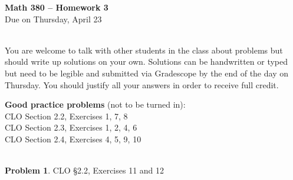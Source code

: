 \documentclass[12pt]{amsart}
\theoremstyle{definition}
\newtheorem{prob}{Problem}
\begin{document}
 \thispagestyle{empty}
\begin{center} {\large \textbf{Math 380 -- Homework  3}} \smallskip \\ 
Due on Thursday, April 23\ \\ \ \\
 \end{center}

You are welcome to talk with other students in the class about problems but should write up solutions on your own. 
Solutions can be handwritten or typed but need to be legible and submitted via Gradescope by the end of the day 
on Thursday. You should justify all your answers in order to receive full credit.  
\bigskip 

\begin{flushleft}

{\bf Good practice problems} (not to be turned in): \\

CLO Section 2.2, Exercises 1, 7, 8\\
CLO Section 2.3, Exercises 1, 2, 4, 6 \\
CLO Section 2.4, Exercises 4, 5, 9, 10\\ \ \\
\bigskip 




\begin{prob} CLO \S2.2, Exercises 11 and 12\\
\end{prob}
\bigskip 


\end{flushleft}
\end{document}

